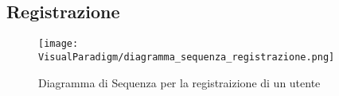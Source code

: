 \subsection{Registrazione}
\label{sec:sequenza_registrazione}
\begin{figure}[H]
  \centering
  \texttt{[image: VisualParadigm/diagramma\_sequenza\_registrazione.png]}
  \caption{Diagramma di Sequenza per la registraizione di un utente}
  \label{fig:sequenza_registrazione}
\end{figure}
\clearpage

